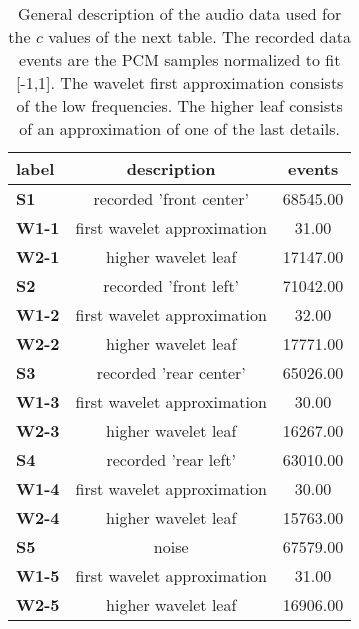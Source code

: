 \begin{table}[h!]
\begin{center}
\begin{tabular}{| l || c | c |}\hline
label & description & events \\\hline\hline
{\bf S1} & recorded 'front center' & 68545.00 \\\hline
{\bf W1-1} & first wavelet approximation & 31.00 \\\hline
{\bf W2-1} & higher wavelet leaf & 17147.00 \\\hline
{\bf S2} & recorded 'front left' & 71042.00 \\\hline
{\bf W1-2} & first wavelet approximation & 32.00 \\\hline
{\bf W2-2} & higher wavelet leaf & 17771.00 \\\hline
{\bf S3} & recorded 'rear center' & 65026.00 \\\hline
{\bf W1-3} & first wavelet approximation & 30.00 \\\hline
{\bf W2-3} & higher wavelet leaf & 16267.00 \\\hline
{\bf S4} & recorded 'rear left' & 63010.00 \\\hline
{\bf W1-4} & first wavelet approximation & 30.00 \\\hline
{\bf W2-4} & higher wavelet leaf & 15763.00 \\\hline
{\bf S5} & noise & 67579.00 \\\hline
{\bf W1-5} & first wavelet approximation & 31.00 \\\hline
{\bf W2-5} & higher wavelet leaf & 16906.00 \\\hline
\end{tabular}
\caption{General description of the audio data used for the $c$ values of the next table.
The recorded data events are the PCM samples normalized to fit [-1,1].
The wavelet first approximation consists of the low frequencies.
The higher leaf consists of an approximation of one of the last details.}
\end{center}
\end{table}
